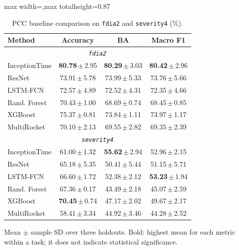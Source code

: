 \documentclass[letterpaper,journal]{IEEEtran}
\providecommand{\DIFaddend}{} %
\begin{document}
\begin{table}[p]
\begin{adjustbox}{max width=\textwidth,max totalheight=0.87\textheight}
\begin{minipage}{\textwidth}
\begin{minipage}[t]{0.48\textwidth}
\centering
\footnotesize
\caption{PCC baseline comparison on \texttt{fdia2} and \texttt{severity4} (\%).}
\label{tab:model_comparison_hard_tasks}
\renewcommand{\arraystretch}{1.15}
\setlength{\tabcolsep}{2.2pt}
\begin{tabular}{@{}lccc@{}}
\hline
Method & Accuracy & BA & Macro F1 \\\hline
\hline\multicolumn{4}{c}{\textit{\texttt{fdia2}}} \\\hline
InceptionTime & \mbox{\textbf{80.78}\,$\pm$\,2.95} & \mbox{\textbf{80.29}\,$\pm$\,3.03} & \mbox{\textbf{80.42}\,$\pm$\,2.96} \\
ResNet & \mbox{73.91\,$\pm$\,5.78} & \mbox{73.99\,$\pm$\,5.33} & \mbox{73.76\,$\pm$\,5.66} \\
LSTM-FCN & \mbox{72.57\,$\pm$\,4.89} & \mbox{72.52\,$\pm$\,4.31} & \mbox{72.35\,$\pm$\,4.66} \\
Rand. Forest & \mbox{70.43\,$\pm$\,1.00} & \mbox{68.69\,$\pm$\,0.74} & \mbox{68.45\,$\pm$\,0.85} \\
XGBoost & \mbox{75.37\,$\pm$\,0.81} & \mbox{73.84\,$\pm$\,1.11} & \mbox{73.97\,$\pm$\,1.17} \\
MultiRocket & \mbox{70.10\,$\pm$\,2.13} & \mbox{69.55\,$\pm$\,2.82} & \mbox{69.35\,$\pm$\,2.39} \\
\hline\multicolumn{4}{c}{\textit{\texttt{severity4}}} \\\hline
InceptionTime & \mbox{61.00\,$\pm$\,1.32} & \mbox{\textbf{55.62}\,$\pm$\,2.94} & \mbox{52.96\,$\pm$\,2.15} \\
ResNet & \mbox{65.18\,$\pm$\,5.35} & \mbox{50.41\,$\pm$\,5.44} & \mbox{51.15\,$\pm$\,5.71} \\
LSTM-FCN & \mbox{66.60\,$\pm$\,1.72} & \mbox{52.38\,$\pm$\,2.12} & \mbox{\textbf{53.23}\,$\pm$\,1.94} \\
Rand. Forest & \mbox{67.36\,$\pm$\,0.17} & \mbox{43.49\,$\pm$\,2.18} & \mbox{45.07\,$\pm$\,2.59} \\
XGBoost & \mbox{\textbf{70.45}\,$\pm$\,0.74} & \mbox{47.17\,$\pm$\,2.02} & \mbox{49.67\,$\pm$\,2.17} \\
MultiRocket & \mbox{58.41\,$\pm$\,3.34} & \mbox{44.92\,$\pm$\,3.46} & \mbox{44.28\,$\pm$\,2.52} \\
\hline\end{tabular}
\par\smallskip\begin{minipage}{\columnwidth}\scriptsize Mean $\pm$ sample SD over three holdouts. Bold: highest mean for each metric within a task; it does not indicate statistical significance.\end{minipage}

\end{minipage}
\end{minipage}
\end{adjustbox}
\end{table}
\DIFaddend
\end{document}

